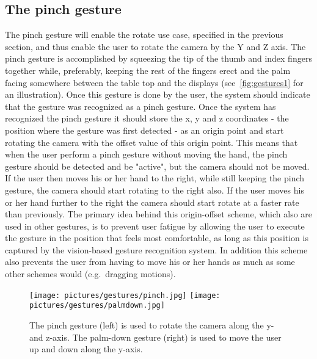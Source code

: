 \subsection{The pinch gesture}
The pinch gesture will enable the rotate use case, specified in the previous section, and thus enable the user to rotate the camera by the Y and Z axis. 
The pinch gesture is accomplished by squeezing the tip of the thumb and index fingers together while, preferably, keeping the rest of the fingers erect and the palm facing 
somewhere between the table top and the displays (see~\vref{fig:gestures1} for an illustration). Once this gesture is done by the user, 
the system should indicate that the gesture was recognized as a pinch gesture.
Once the system has recognized the pinch gesture it should store the x, y and z coordinates - the position where the gesture was first detected - as an origin point and start rotating the 
camera with the offset value of this origin point. This means that when the user perform a pinch gesture without moving the hand, the pinch gesture should be detected and be
"active", but the camera should not be moved. If the user then moves his or her hand to the right, while still keeping the pinch gesture, the camera should start rotating 
to the right also. If the user moves his or her hand further to the right the camera should start rotate at a faster rate than previously.  
The primary idea behind this origin-offset scheme, which also are used in other gestures, is to prevent user fatigue by allowing the user to execute
the gesture in the position that feels most comfortable, as long as this position is captured by the vision-based gesture recognition system. 
In addition this scheme also prevents the user from having to move his or her hands as much as some other schemes would (e.g.~dragging motions).  

\begin{figure}%
	\texttt{[image: pictures/gestures/pinch.jpg]}
    \texttt{[image: pictures/gestures/palmdown.jpg]}
	\caption[The pinch and palm-down gestures]{The pinch gesture (left) is used to rotate the camera along the y- and z-axis. 
             The palm-down gesture (right) is used to move the user up and down along the y-axis.}
	\label{fig:gestures1}
\end{figure} 

